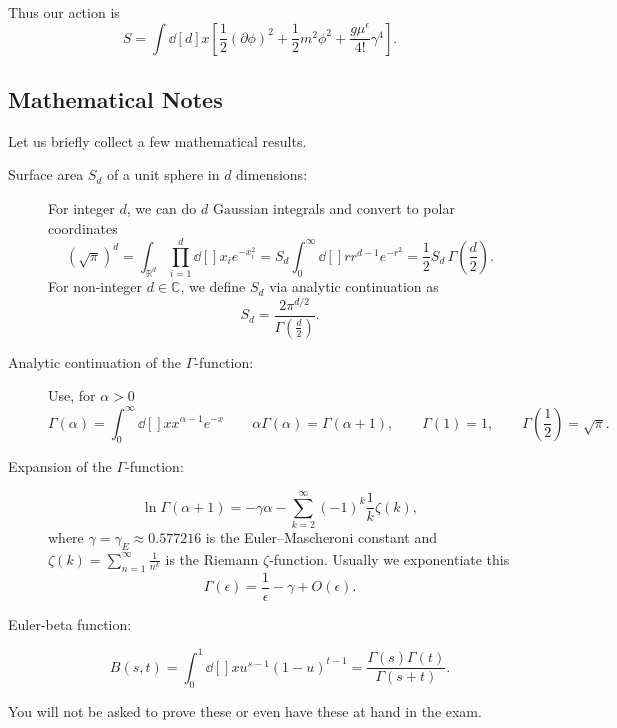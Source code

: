 
Thus our action is 
\begin{equation}
  S = \int \dd[d]{x} \left[ \frac{1}{2} (\partial \phi)^2 + \frac{1}{2} m^2 \phi^2 + \frac{g \mu^\epsilon}{4!} \gamma^4 \right].
\end{equation}

\subsection{Mathematical Notes}%
\label{sub:mathematical_notes}

Let us briefly collect a few mathematical results.
\begin{description}
  \item[Surface area $S_d$ of a unit sphere in $d$ dimensions:]
    For integer $d$, we can do $d$ Gaussian integrals and convert to polar coordinates
    \begin{equation}
      (\sqrt{\pi})^d = \int_{\mathbb{R}^d} \prod_{i=1}^d \dd[]{x_i} e^{-x_i^2} = S_d \int_0^{\infty} \dd[]{r} r^{d-1} e^{-r^2} = \frac{1}{2} S_d \, \Gamma(\frac{d}{2}).
    \end{equation}
    For non-integer $d \in \mathbb{C}$, we define $S_d$ via analytic continuation as
    \begin{equation}
      S_d = \frac{2 \pi^{d / 2}}{\Gamma(\frac{d}{2})}.
    \end{equation}
  \item[Analytic continuation of the $\Gamma$-function:]
    Use, for $\alpha > 0$
    \begin{equation}
      \Gamma(\alpha) = \int_0^\infty \dd[]{x} x^{\alpha -1} e^{-x} \qquad \alpha \Gamma(\alpha) = \Gamma(\alpha + 1), \qquad 
      \Gamma(1) = 1, \qquad \Gamma(\frac{1}{2}) = \sqrt{\pi}.
    \end{equation}
  \item[Expansion of the $\Gamma$-function:]
    \begin{equation}
      \ln \Gamma(\alpha + 1) = -\gamma \alpha - \sum_{k=2}^{\infty} (-1)^k \frac{1}{k} \zeta(k),
    \end{equation}
    where $\gamma = \gamma_E \approx 0.577216$  is the Euler--Mascheroni constant and $\zeta(k) = \sum_{n=1}^{\infty} \frac{1}{n^k}$ is the Riemann $\zeta$-function.
    Usually we exponentiate this
    \begin{equation}
      \Gamma(\epsilon) = \frac{1}{\epsilon} - \gamma + O(\epsilon).
    \end{equation}
  \item[Euler-beta function:]
    \begin{equation}
      B(s, t) = \int_{0}^{1}\dd[]{x} u^{s-1} (1-u)^{t-1} = \frac{\Gamma(s) \Gamma(t)}{\Gamma(s + t)}.
    \end{equation}
\end{description}
\begin{remark}
  You will not be asked to prove these or even have these at hand in the exam.
\end{remark}

